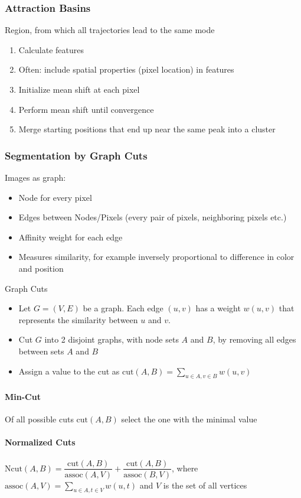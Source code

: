 \begin{multicols}{2}
    \subsubsection{Attraction Basins}
    Region, from which all trajectories lead to the same mode
    \begin{enumerate}
        \item Calculate features
        \item Often: include spatial properties (pixel location) in features
        \item Initialize mean shift {\color{red}at each pixel}
        \item Perform mean shift until convergence
        \item Merge starting positions that end up near the same peak into a cluster
    \end{enumerate}

    \subsubsection{Segmentation by Graph Cuts}
    Images as graph:
    \begin{itemize}
        \item Node for every pixel
        \item Edges between Nodes/Pixels (every pair of pixels, neighboring pixels etc.)
        \item Affinity weight for each edge
        \item Measures similarity, for example inversely proportional to difference in color and position
    \end{itemize}
    Graph Cuts
    \begin{itemize}
        \item Let $G = (V,E)$ be a graph.
              Each edge $(u,v)$ has a weight $w(u,v)$ that represents the similarity between $u$ and $v$.
        \item Cut $G$ into 2 disjoint graphs, with node sets $A$ and $B$, by removing all edges between sets $A$ and $B$
        \item Assign a value to the cut as $\text{cut}(A,B) = \sum_{u \in A, v \in B} w(u,v)$
    \end{itemize}
    \paragraph{Min-Cut}
    Of all possible cuts $\text{cut}(A,B)$ select the one with the minimal value
    \paragraph{Normalized Cuts}
    $\text{Ncut}(A,B) = \dfrac{\text{cut}(A,B)}{\text{assoc}(A,V)} + \dfrac{\text{cut}(A,B)}{\text{assoc}(B,V)}$, where $\text{assoc}(A,V) = \sum_{u \in A, t \in V} w(u,t)$ and $V$ is the set of all vertices


\end{multicols}
